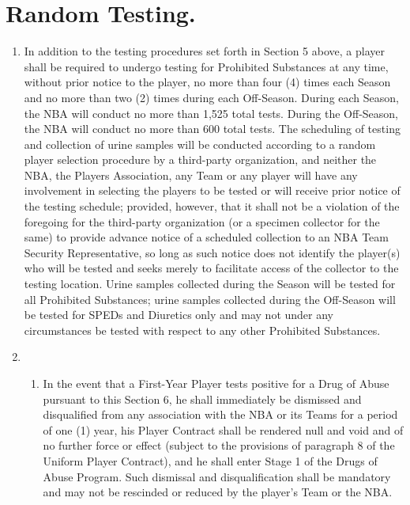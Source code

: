 \documentclass[
]{book}
\providecommand{\tightlist}{%
  \setlength{\itemsep}{0pt}\setlength{\parskip}{0pt}}
\begin{document}
\hypertarget{random-testing.}{%
\section{Random Testing.}\label{random-testing.}}

\begin{enumerate}
\def\labelenumi{(\alph{enumi})}
\item
  In addition to the testing procedures set forth in Section 5 above, a player shall be required to undergo testing for Prohibited Substances at any time, without prior notice to the player, no more than four (4) times each Season and no more than two (2) times during each Off-Season. During each Season, the NBA will conduct no more than 1,525 total tests. During the Off-Season, the NBA will conduct no more than 600 total tests. The scheduling of testing and collection of urine samples will be conducted according to a random player selection procedure by a third-party organization, and neither the NBA, the Players Association, any Team or any player will have any involvement in selecting the players to be tested or will receive prior notice of the testing schedule; provided, however, that it shall not be a violation of the foregoing for the third-party organization (or a specimen collector for the same) to provide advance notice of a scheduled collection to an NBA Team Security Representative, so long as such notice does not identify the player(s) who will be tested and seeks merely to facilitate access of the collector to the testing location. Urine samples collected during the Season will be tested for all Prohibited Substances; urine samples collected during the Off-Season will be tested for SPEDs and Diuretics only and may not under any circumstances be tested with respect to any other Prohibited Substances.
\item
  \begin{enumerate}
  \def\labelenumii{(\roman{enumii})}
  \tightlist
  \item
    In the event that a First-Year Player tests positive for a Drug of Abuse pursuant to this Section 6, he shall immediately be dismissed and disqualified from any association with the NBA or its Teams for a period of one (1) year, his Player Contract shall be rendered null and void and of no further force or effect (subject to the provisions of paragraph 8 of the Uniform Player Contract), and he shall enter Stage 1 of the Drugs of Abuse Program. Such dismissal and disqualification shall be mandatory and may not be rescinded or reduced by the player's Team or the NBA.

\end{enumerate}
\end{enumerate}
\end{document}
